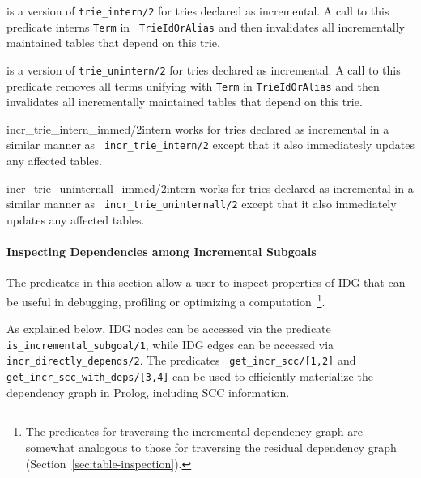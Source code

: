 \begin{description}
%
is a version of {\tt trie\_intern/2} for tries declared as
incremental.  A call to this predicate interns {\tt Term} in {\tt
  TrieIdOrAlias} and then invalidates all incrementally maintained
tables that depend on this trie.

%
is a version of {\tt trie\_unintern/2} for tries declared as
incremental.  A call to this predicate removes all terms unifying with
{\tt Term} in {\tt TrieIdOrAlias} and then invalidates all
incrementally maintained tables that depend on this trie.

           {incr\_trie\_intern\_immed/2}{intern}
%
works for tries declared as incremental in a similar manner as {\tt
  incr\_trie\_intern/2} except that it also immediatesly updates any
affected tables.

{incr\_trie\_uninternall\_immed/2}{intern}
%
works for tries declared as incremental in a similar manner as {\tt
  incr\_trie\_uninternall/2} except that it also immediately updates
any affected tables.
\end{description}

\paragraph{Inspecting Dependencies among Incremental Subgoals}
%
The predicates in this section allow a user to inspect properties of
IDG that can be useful in debugging, profiling or optimizing a
computation~\footnote{The predicates for traversing the incremental
  dependency graph are somewhat analogous to those for traversing the
  residual dependency graph (Section~\ref{sec:table-inspection}).}.

As explained below, IDG nodes can be accessed via the predicate {\tt
  is\_incremental\_subgoal/1}, while IDG edges can be accessed via
{\tt incr\_directly\_depends/2}.  The predicates {\tt
  get\_incr\_scc/[1,2]} and {\tt get\_incr\_scc\_with\_deps/[3,4]} can
be used to efficiently materialize the dependency graph in Prolog,
including SCC information.

